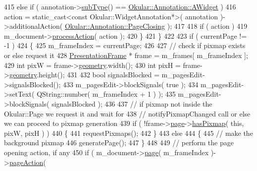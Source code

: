 \begin{DoxyCode}
415             \textcolor{keywordflow}{else} \textcolor{keywordflow}{if} ( annotation->\hyperlink{classOkular_1_1Annotation_af9833449767eacd740f377e69a1fdd48}{subType}() == 
      \hyperlink{classOkular_1_1Annotation_af71b46e37d5f850b97d5c4de3be9aac0aa0f6a560b971fe69d18156176258d6c8}{Okular::Annotation::AWidget} )
416                 action = static\_cast<const Okular::WidgetAnnotation*>( annotation )->additionalAction( 
      \hyperlink{classOkular_1_1Annotation_aa34152e337b1cb13e9327f37fc295057a163dda71b8c9ac45ce1c250f37458bac}{Okular::Annotation::PageClosing} );
417 
418             \textcolor{keywordflow}{if} ( action )
419                 m\_document->\hyperlink{classOkular_1_1Document_aabdf41f40fe0391590391e303891b5ed}{processAction}( action );
420         \}
421     \}
422 
423     \textcolor{keywordflow}{if} ( currentPage != -1 )
424     \{
425         m\_frameIndex = currentPage;
426 
427         \textcolor{comment}{// check if pixmap exists or else request it}
428         \hyperlink{structPresentationFrame}{PresentationFrame} * frame = m\_frames[ m\_frameIndex ];
429         \textcolor{keywordtype}{int} pixW = frame->\hyperlink{structPresentationFrame_af80fd4c4305934bb3723aec0b7f72bcf}{geometry}.width();
430         \textcolor{keywordtype}{int} pixH = frame->\hyperlink{structPresentationFrame_af80fd4c4305934bb3723aec0b7f72bcf}{geometry}.height();
431 
432         \textcolor{keywordtype}{bool} signalsBlocked = m\_pagesEdit->signalsBlocked();
433         m\_pagesEdit->blockSignals( \textcolor{keyword}{true} );
434         m\_pagesEdit->setText( QString::number( m\_frameIndex + 1 ) );
435         m\_pagesEdit->blockSignals( signalsBlocked );
436 
437         \textcolor{comment}{// if pixmap not inside the Okular::Page we request it and wait for}
438         \textcolor{comment}{// notifyPixmapChanged call or else we can proceed to pixmap generation}
439         \textcolor{keywordflow}{if} ( !frame->\hyperlink{structPresentationFrame_ab40e6871a08519f4f2c97d3f1009f2a5}{page}->\hyperlink{classOkular_1_1Page_a4c14959c8283b76513d4ba4139634575}{hasPixmap}( \textcolor{keyword}{this}, pixW, pixH ) )
440         \{
441             requestPixmaps();
442         \}
443         \textcolor{keywordflow}{else}
444         \{
445             \textcolor{comment}{// make the background pixmap}
446             generatePage();
447         \}
448 
449         \textcolor{comment}{// perform the page opening action, if any}
450         \textcolor{keywordflow}{if} ( m\_document->\hyperlink{classOkular_1_1Document_a1c95c2f192d739c217d00971da48f69d}{page}( m\_frameIndex )->\hyperlink{classOkular_1_1Page_a960c4dd29f12aaabaa66880c19540203}{pageAction}( 

\end{DoxyCode}
